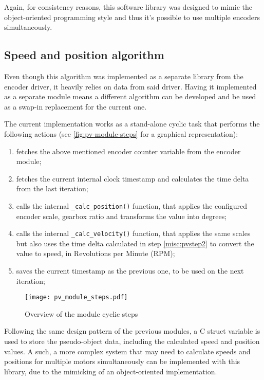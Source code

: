 Again, for consistency reasons, this software library was designed to mimic the object-oriented programming style and thus it's possible to use multiple encoders simultaneously.

\subsection{Speed and position algorithm}
Even though this algorithm was implemented as a separate library from the encoder driver, it heavily relies on data from said driver.
Having it implemented as a separate module means a different algorithm can be developed and be used as a swap-in replacement for the current one.

The current implementation works as a stand-alone cyclic task that performs the following actions (see \autoref{fig:pv-module-steps} for a graphical representation):
\begin{enumerate}
	\item fetches the above mentioned encoder counter variable from the encoder module;
	\item fetches the current internal clock timestamp and calculates the time delta from the last iteration; \label{misc:pvstep2}
	\item calls the internal \verb|_calc_position()| function, that applies the configured encoder scale, gearbox ratio and transforms the value into degrees;
	\item calls the internal \verb|_calc_velocity()| function, that applies the same scales but also uses the time delta calculated in step \ref{misc:pvstep2} to convert the value to speed, in Revolutions per Minute (RPM);
	\item saves the current timestamp as the previous one, to be used on the next iteration;
\end{enumerate}

\begin{figure}[htp]
	\centering
	\texttt{[image: pv\_module\_steps.pdf]}
	\caption{Overview of the module cyclic steps}
	\label{fig:pv-module-steps}
\end{figure}

Following the same design pattern of the previous modules, a C struct variable is used to store the pseudo-object data, including the calculated speed and position values.
A such, a more complex system that may need to calculate speeds and positions for multiple motors simultaneously can be implemented with this library, due to the mimicking of an object-oriented implementation.

